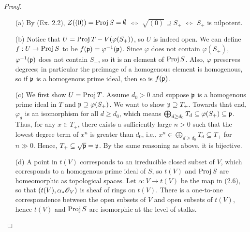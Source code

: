 \documentclass{article}
\begin{document}
\begin{enumerate} [label=\textbf{\arabic*.}, leftmargin=0em]
\begin{proof} $ $ \vspace{0pt}
    \begin{itemize} [leftmargin=0cm]
        \item[(a)] By (Ex. 2.2), $Z((0)) = \operatorname{Proj}{S} = \emptyset$ $\iff$ $\sqrt{(0)} \supseteq S_+$ $\iff$ $S_+$ is nilpotent.

        \item[(b)] Notice that $U = \operatorname{Proj}{T} - V(\varphi(S_+))$, so $U$ is indeed open. We can define $f : U \to \operatorname{Proj}{S}$ to be $f(\mathfrak{p}) = \varphi^{-1}(\mathfrak{p})$. Since $\varphi$ does not contain $\varphi(S_+)$, $\varphi^{-1}(\mathfrak{p})$ does not contain $S_+$, so it is an element of $\operatorname{Proj}{S}$. Also, $\varphi$ preserves degrees; in particular the preimage of a homogenous element is homogenous, so if $\mathfrak{p}$ is a homogenous prime ideal, then so is $f(\mathfrak{p})$.

        \item[(c)] We first show $U = \operatorname{Proj}{T}$. Assume $d_0 > 0$ and suppose $\mathfrak{p}$ is a homogenous prime ideal in $T$ and $\mathfrak{p} \supseteq \varphi(S_+)$. We want to show $\mathfrak{p} \supseteq T_+$. Towards that end, $\varphi_d$ is an isomorphism for all $d \geq d_0$, which means $\bigoplus_{d \geq d_0} T_d \subseteq \varphi(S_+) \subseteq \mathfrak{p}$. Thus, for any $x \in T_+$, there exists a sufficiently large $n > 0$ such that the lowest degree term of $x^n$ is greater than $d_0$, i.e., $x^n \in \bigoplus_{d \geq d_0} T_d \subseteq T_+$ for $n \gg 0$. Hence, $T_+ \subseteq \sqrt{\mathfrak{p}} = \mathfrak{p}$. By the same reasoning as above, it is bijective.

        \item[(d)] A point in $t(V)$ corresponds to an irreducible closed subset of $V$, which corresponds to a homogenous prime ideal of $S$, so $t(V)$ and $\operatorname{Proj}{S}$ are homeomorphic as topological spaces. Let $\alpha : V \to t(V)$ be the map in (2.6), so that $(t(V), \alpha_* \mathscr{O}_V)$ is sheaf of rings on $t(V)$. There is a one-to-one correspondence between the open subsets of $V$ and open subsets of $t(V)$, hence $t(V)$ and $\operatorname{Proj}{S}$ are isomorphic at the level of stalks.
    \end{itemize}
\end{proof}


\end{enumerate}
\end{document}
